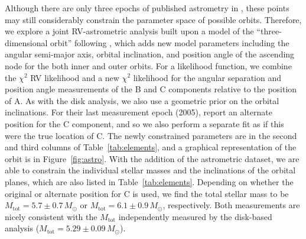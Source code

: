 \documentclass[twocolumn]{aastex61}
\begin{document}
Although there are only three epochs of published astrometry in \citet{berger11}, these points may still considerably constrain the parameter space of possible orbits. Therefore, we explore a joint RV-astrometric analysis built upon a model of the ``three-dimensional orbit'' following \citet{murray10}, which adds new model parameters including the angular semi-major axis, orbital inclination, and position angle of the ascending node for the both inner and outer orbits. For a likelihood function, we combine the $\chi^2$ RV likelihood and a new $\chi^2$ likelihood for the angular separation and position angle measurements of the B and C components relative to the position of A. As with the disk analysis, we also use a geometric prior on the orbital inclinations. For their last measurement epoch (2005), \citet{berger11} report an alternate position for the C component, and so we also perform a separate fit as if this were the true location of C.
The newly constrained parameters are in the second and third columns of Table~\ref{tab:elements}, and a graphical representation of the orbit is in Figure~\ref{fig:astro}.
With the addition of the astrometric dataset, we are able to constrain the individual stellar masses and the inclinations of the orbital planes, which are also listed in Table~\ref{tab:elements}. Depending on whether the original or alternate position for C is used, we find the total stellar mass to be $M_\mathrm{tot} = 5.7 \pm 0.7\,M_\odot$ or $M_\mathrm{tot} = 6.1 \pm 0.9\,M_\odot$, respectively. Both measurements are nicely consistent with the $M_\mathrm{tot}$ independently measured by the disk-based analysis ($M_\mathrm{tot} = 5.29 \pm 0.09\,M_\odot$).
\end{document}
